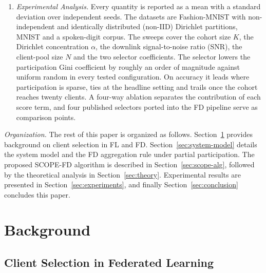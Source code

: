 \documentclass[journal]{IEEEtran}
\newcommand{\rev}[1]{#1}
\begin{document}
\begin{enumerate}
    \item \textit{Experimental Analysis.} \rev{Every quantity is reported as a mean with a standard deviation over independent seeds. The datasets are Fashion-MNIST with non-independent and identically distributed (non-IID) Dirichlet partitions, MNIST and a spoken-digit corpus. The sweeps cover the cohort size $K$, the Dirichlet concentration $\alpha$, the downlink signal-to-noise ratio (SNR), the client-pool size $N$ and the two selector coefficients. The selector lowers the participation Gini coefficient by roughly an order of magnitude against uniform random in every tested configuration. On accuracy it leads where participation is sparse, ties at the headline setting and trails once the cohort reaches twenty clients. A four-way ablation separates the contribution of each score term, and four published selectors ported into the FD pipeline serve as comparison points.}
\end{enumerate}


\textit{Organization.} The rest of this paper is organized as follows. Section~\ref{sec:related-work} provides background on client selection in FL and FD. Section~\ref{sec:system-model} details the system model and the FD aggregation rule under partial participation. The proposed SCOPE-FD algorithm is described in Section~\ref{sec:scope-alg}, followed by the theoretical analysis in Section~\ref{sec:theory}. Experimental results are presented in Section~\ref{sec:experiments}, and finally Section~\ref{sec:conclusion} concludes this paper.

\section{Background}
\label{sec:related-work}

\subsection{Client Selection in Federated Learning}
\label{ssec:rw-fl-selection}
\end{document}
